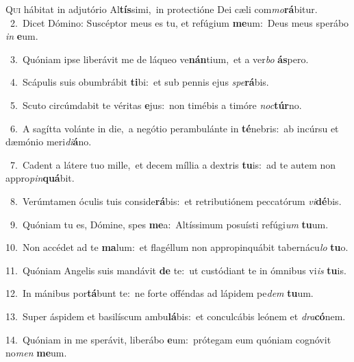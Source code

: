 \lettrine{\initial\textcolor{\initialcolor}{Q}}{ui} hábitat in adjutório Al\-\textbf{tís}\-simi,~\star in protectióne Dei cæli com\-\textit{mo}\-\textbf{rá}bitur.\\
{\numbfont\textcolor{\numbcolor}{~2.}}~Dicet Dómino: Suscéptor meus es tu, et refúgium \textbf{me}\-um:~\star Deus meus sperábo \textit{in} \textbf{e}\-um.\par
{\numbfont\textcolor{\numbcolor}{~3.}}~Quóniam ipse liberávit me de láqueo ve\-\textbf{nán}\-tium,~\star et a ver\textit{bo} \textbf{ás}\-pero.\par
{\numbfont\textcolor{\numbcolor}{~4.}}~Scápulis suis obumbrábit \textbf{ti}\-bi:~\star et sub pennis ejus \textit{spe}\-\textbf{rá}bis.\par
{\numbfont\textcolor{\numbcolor}{~5.}}~Scuto circúmdabit te véritas \textbf{e}\-jus:~\star non timébis a timóre \textit{noc}\-\textbf{túr}no.\par
{\numbfont\textcolor{\numbcolor}{~6.}}~A sagítta volánte in die,~\dagger a negótio perambulánte in \textbf{té}\-nebris:~\star ab incúrsu et dæmónio meri\-\textit{di}\-\textbf{á}no.\par
{\numbfont\textcolor{\numbcolor}{~7.}}~Cadent a látere tuo mille,~\dagger et decem míllia a dextris \textbf{tu}\-is:~\star ad te autem non appro\-\textit{pin}\-\textbf{quá}bit.\par
{\numbfont\textcolor{\numbcolor}{~8.}}~Verúmtamen óculis tuis conside\-\textbf{rá}\-bis:~\star et retributiónem peccatórum \textit{vi}\-\textbf{dé}bis.\par
{\numbfont\textcolor{\numbcolor}{~9.}}~Quóniam tu es, Dómine, spes \textbf{me}\-a:~\star Altíssimum posuísti refúgi\textit{um} \textbf{tu}\-um.\par
{\numbfont\textcolor{\numbcolor}{10.}}~Non accédet ad te \textbf{ma}\-lum:~\star et flagéllum non appropinquábit tabernácu\textit{lo} \textbf{tu}\-o.\par
{\numbfont\textcolor{\numbcolor}{11.}}~Quóniam Angelis suis mandávit \textbf{de} te:~\star ut custódiant te in ómnibus vi\textit{is} \textbf{tu}\-is.\par
{\numbfont\textcolor{\numbcolor}{12.}}~In mánibus por\-\textbf{tá}\-bunt te:~\star ne forte offéndas ad lápidem pe\textit{dem} \textbf{tu}\-um.\par
{\numbfont\textcolor{\numbcolor}{13.}}~Super áspidem et basilíscum ambu\-\textbf{lá}\-bis:~\star et conculcábis leónem et \textit{dra}\-\textbf{có}nem.\par
{\numbfont\textcolor{\numbcolor}{14.}}~Quóniam in me sperávit, liberábo \textbf{e}\-um:~\star prótegam eum quóniam cognóvit no\textit{men} \textbf{me}\-um.\par
